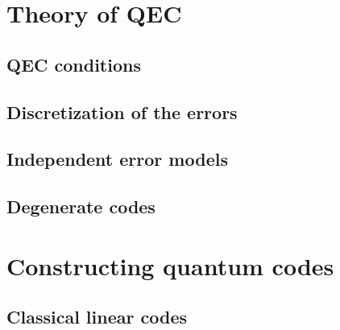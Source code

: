 \section{Theory of QEC}

\subsection{QEC conditions}

\subsection{Discretization of the errors}

\subsection{Independent error models}

\subsection{Degenerate codes}


\section{Constructing quantum codes}
\subsection{Classical linear codes}


